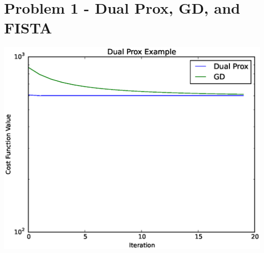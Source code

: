 \documentclass[a4paper]{article}
\begin{document}
\renewcommand{\theFancyVerbLine}{
  \sffamily\textcolor[rgb]{0.5,0.5,0.5}{\scriptsize\arabic{FancyVerbLine}}}

\section{Problem 1 - Dual Prox, GD, and FISTA}

  \includegraphics[scale=0.5]{dual_prox.eps}


\inputminted{python}{hw6_p3.py}
\end{document}
